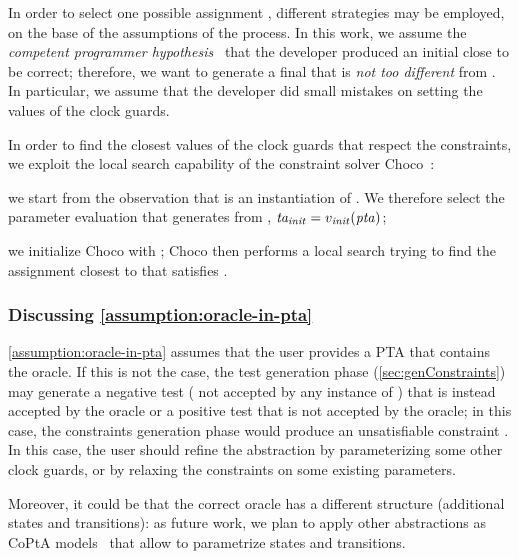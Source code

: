 \begin{tikzborder}{\cite{Gargantini16:validation}}
\begin{tikzborder}{\cite{gargantini_combinatorial_2017}}
\begin{tikzborder}{\cite{gargantini_combinatorial_2017}}
\begin{tikzborder}{\cite{garn2019}}
\begin{tikzborder}{\cite{arcaini2019achieving}}
\begin{tikzborder}{\cite{arcaini2019varivolution}}
\begin{tikzborder}{}
In order to select one possible assignment \vRep, different strategies may be employed, on the base of the assumptions of the process. In this work, we assume the {\it competent programmer hypothesis}~\cite{surveyMutationTestingPapadakis2018} that the developer produced an initial \ta \initTa close to be correct; therefore, we want to generate a final \ta \repTa that is {\it not too different} from \initTa. In particular, we assume that the developer did small mistakes on setting the values of the clock guards.

In order to find the closest values of the clock guards that respect the constraints, we exploit the local search capability of the constraint solver Choco~\cite{choco}:
%
\begin{compactenum}
	\item we start from the observation that \initTa is an instantiation of \ptaProc. We therefore select the parameter evaluation \vInit that generates \initTa from \ptaProc, \ie{} $\mathit{ta_{init}} = v_{\mathit{init}}(\mathit{pta})$;
	\item we initialize Choco with \vInit; Choco then performs a local search trying to find the assignment closest to \vInit that satisfies \ptaConstr.
\end{compactenum}
\end{tikzborder}

\subsubsection{Discussing \ref{assumption:oracle-in-pta}}\label{ss:discussion-abstraction}

\begin{tikzborder}{}
\ref{assumption:oracle-in-pta} assumes that the user provides a PTA \ptaProc that contains the oracle.
If this is not the case, the test generation phase (\ref{sec:genConstraints}) may generate a negative test (\ie{} not accepted by any instance of \ptaProc) that is instead accepted by the oracle or a positive test that is not accepted by the oracle;
in this case, the constraints generation phase would produce an unsatisfiable constraint \ptaConstr. In this case, the user should refine the abstraction by parameterizing some other clock guards, or by relaxing the constraints on some existing parameters.

Moreover, it could be that the correct oracle has a different structure (additional states and transitions): as future work, we plan to apply other abstractions as CoPtA models~\cite{luthmann2019minimum} that allow to parametrize states and transitions.


\end{tikzborder}
\end{tikzborder}
\end{tikzborder}
\end{tikzborder}
\end{tikzborder}
\end{tikzborder}
\end{tikzborder}
